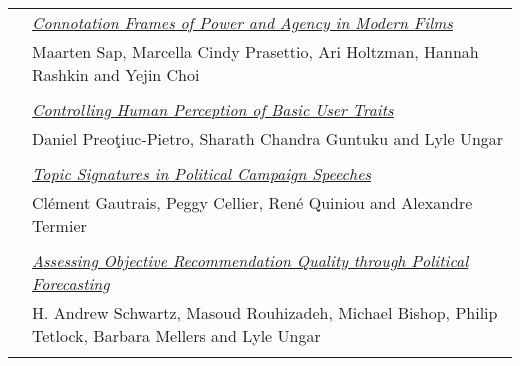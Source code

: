 \begin{tabular}{p{20mm}p{128mm}}
 & \hyperlink{page.2312}{\em Connotation Frames of Power and Agency in Modern Films}\\
         & Maarten Sap, Marcella Cindy Prasettio, Ari Holtzman, Hannah Rashkin and Yejin Choi \\
\\

 & \hyperlink{page.2318}{\em Controlling Human Perception of Basic User Traits}\\
         & Daniel Preoţiuc-Pietro, Sharath Chandra Guntuku and Lyle Ungar \\
\\

 & \hyperlink{page.2325}{\em Topic Signatures in Political Campaign Speeches}\\
         & Cl\'{e}ment Gautrais, Peggy Cellier, Ren\'{e} Quiniou and Alexandre Termier \\
\\

 & \hyperlink{page.2331}{\em Assessing Objective Recommendation Quality through Political Forecasting}\\
         & H. Andrew Schwartz, Masoud Rouhizadeh, Michael Bishop, Philip Tetlock, Barbara Mellers and Lyle Ungar \\
\\

\end{tabular}
\newpage
